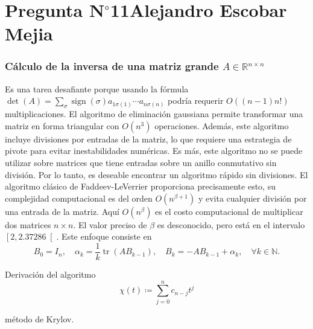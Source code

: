 \section{Pregunta N$^{\circ}$11\qquad Alejandro Escobar Mejia}

\begin{frame}
	\frametitle{Cálculo de la inversa de una matriz grande $A\in\mathbb{R}^{n\times n}$}

	Es una tarea desafiante porque usando la fórmula
	\begin{math}
		\det\left(A\right)=
		\sum_{\sigma}
		\operatorname{sign}\left(\sigma\right)
		a_{1\sigma\left(1\right)}
		\cdots
		a_{n\sigma\left(n\right)}
	\end{math}
	podría requerir $O\left(\left(n-1\right)n!\right)$
	multiplicaciones.
	El algoritmo de eliminación gaussiana permite transformar una
	matriz en forma triangular con $O\left(n^{3}\right)$ operaciones.
	Además, este algoritmo incluye divisiones por entradas de la
	matriz, lo que requiere una estrategia de pivote para evitar
	inestabilidades numéricas.
	Es más, este algoritmo no se puede utilizar sobre matrices que
	tiene entradas sobre un anillo conmutativo sin división.
	Por lo tanto, es deseable encontrar un algoritmo rápido sin
	divisiones.
	El algoritmo clásico de \alert{Faddeev-LeVerrier} proporciona
	precisamente esto, su complejidad computacional es del orden
	$O\left(n^{\beta+1}\right)$ y evita cualquier división por una
	entrada de la matriz.
	Aquí $O\left(n^{\beta}\right)$ es el costo computacional de
	multiplicar dos matrices $n\times n$.
	El valor preciso de $\beta$ es desconocido, pero está en el
	intervalo $\left[2,2.37286\right[$. Este enfoque consiste en
	\begin{equation*}
		B_{0}=I_{n},\quad
		\alpha_{k}=
		\dfrac{1}{k}
		\operatorname{tr}\left(AB_{k-1}\right),\quad
		B_{k}=-AB_{k-1}+\alpha_{k},\quad
		\forall k\in\mathbb{N}.
	\end{equation*}

	\begin{block}{Derivación del algoritmo}
		\begin{equation*}
			\chi\left(t\right)\coloneqq
			\sum\limits_{j=0}^{n}
			c_{n-j}t^{j}
		\end{equation*}
	\end{block}

	\alert{método de Krylov}.
\end{frame}

